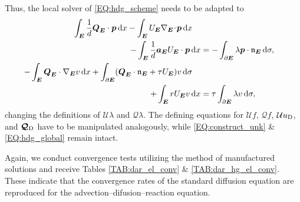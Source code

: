 \documentclass[a4paper, english, 12pt, reqno, draft]{amsart}
\theoremstyle{definition}
\theoremstyle{remark}
\numberwithin{equation}{section}
\newcommand{\Edge}{{\ensuremath{\boldsymbol E}}}
\newcommand{\Nabla}{\ensuremath{\nabla_\Edge}}
\newcommand{\Div}{\ensuremath{\Nabla\!\cdot\!}}
\newcommand{\Normal}{\ensuremath{\mathfrak n_\Edge}}
\renewcommand{\vec}[1]{\ensuremath{\boldsymbol{#1}}}
\newcommand{\dx}{\ensuremath{\, \textup d x}}
\newcommand{\ds}{\ensuremath{\, \textup d \sigma}}
\newcommand{\localU}{\ensuremath{\mathcal U}}
\newcommand{\localQ}{\ensuremath{\vec{\mathcal Q}}}
\begin{document}
Thus, the local solver of \eqref{EQ:hdg_scheme} needs to be adapted to
% 
\begin{subequations}
 \begin{align}
  \int_\Edge \frac{1}{d} \vec Q_\Edge \cdot \vec p \dx - \int_\Edge U_\Edge \Div \vec p \dx \quad \notag \\
  - \int_\Edge \frac{1}{d} \vec a_\Edge U_\Edge \cdot \vec p \dx & = - \int_{\partial \Edge} \lambda \vec p \cdot \Normal \ds, \label{EQ:dar_primary}\\
  - \int_\Edge \vec Q_\Edge \cdot \Nabla v \dx  + \int_{\partial \Edge} ( \vec Q_\Edge \cdot \Normal + \tau  U_\Edge ) v \ds \quad \notag \\
  + \int_\Edge r U_\Edge v \dx & = \tau \int_{\partial \Edge} \lambda v \ds, \label{EQ:dar_flux}
 \end{align}
\end{subequations}
% 
changing the definitions of $\localU \lambda$ and $\localQ \lambda$. The defining equations for $\localU f$, $\localQ f$, $\localU u_\textup D$, and $\localQ_\textup D$ have to be manipulated analogously, while \eqref{EQ:construct_unk} \& \eqref{EQ:hdg_global} remain intact.

Again, we conduct convergence tests utilizing the method of manufactured solutions and receive Tables \ref{TAB:dar_el_conv} \& \ref{TAB:dar_hg_el_conv}. These indicate that the convergence rates of the standard diffusion equation are reproduced for the advection--difusion--reaction equation.
% 
\end{document}
